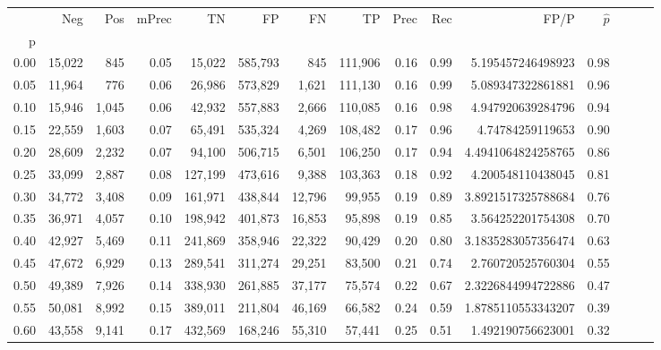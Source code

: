 \begin{tabular}{rrrrrrrrrrrrrrr}
\toprule
{} &     Neg &    Pos & mPrec &       TN &       FP &       FN &       TP &  Prec &   Rec &                  FP/P & $\hat{p}$ \\
p    &         &        &       &          &          &          &          &       &       &                       &           \\
\midrule
0.00 &  15,022 &    845 &  0.05 &   15,022 &  585,793 &      845 &  111,906 &  0.16 &  0.99 &     5.195457246498923 &      0.98 \\
0.05 &  11,964 &    776 &  0.06 &   26,986 &  573,829 &    1,621 &  111,130 &  0.16 &  0.99 &     5.089347322861881 &      0.96 \\
0.10 &  15,946 &  1,045 &  0.06 &   42,932 &  557,883 &    2,666 &  110,085 &  0.16 &  0.98 &     4.947920639284796 &      0.94 \\
0.15 &  22,559 &  1,603 &  0.07 &   65,491 &  535,324 &    4,269 &  108,482 &  0.17 &  0.96 &      4.74784259119653 &      0.90 \\
0.20 &  28,609 &  2,232 &  0.07 &   94,100 &  506,715 &    6,501 &  106,250 &  0.17 &  0.94 &    4.4941064824258765 &      0.86 \\
0.25 &  33,099 &  2,887 &  0.08 &  127,199 &  473,616 &    9,388 &  103,363 &  0.18 &  0.92 &     4.200548110438045 &      0.81 \\
0.30 &  34,772 &  3,408 &  0.09 &  161,971 &  438,844 &   12,796 &   99,955 &  0.19 &  0.89 &    3.8921517325788684 &      0.76 \\
0.35 &  36,971 &  4,057 &  0.10 &  198,942 &  401,873 &   16,853 &   95,898 &  0.19 &  0.85 &     3.564252201754308 &      0.70 \\
0.40 &  42,927 &  5,469 &  0.11 &  241,869 &  358,946 &   22,322 &   90,429 &  0.20 &  0.80 &    3.1835283057356474 &      0.63 \\
0.45 &  47,672 &  6,929 &  0.13 &  289,541 &  311,274 &   29,251 &   83,500 &  0.21 &  0.74 &     2.760720525760304 &      0.55 \\
0.50 &  49,389 &  7,926 &  0.14 &  338,930 &  261,885 &   37,177 &   75,574 &  0.22 &  0.67 &    2.3226844994722886 &      0.47 \\
0.55 &  50,081 &  8,992 &  0.15 &  389,011 &  211,804 &   46,169 &   66,582 &  0.24 &  0.59 &    1.8785110553343207 &      0.39 \\
0.60 &  43,558 &  9,141 &  0.17 &  432,569 &  168,246 &   55,310 &   57,441 &  0.25 &  0.51 &     1.492190756623001 &      0.32 \\

\end{tabular}
